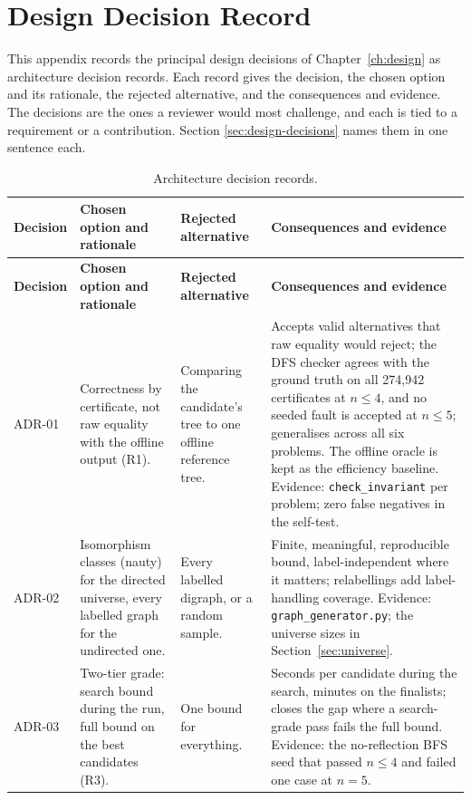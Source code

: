\chapter{Design Decision Record}
\label{app:decisions}

This appendix records the principal design decisions of
Chapter~\ref{ch:design} as architecture decision records. Each record gives the
decision, the chosen option and its rationale, the rejected alternative, and the
consequences and evidence. The decisions are the ones a reviewer would most
challenge, and each is tied to a requirement or a contribution. Section
\ref{sec:design-decisions} names them in one sentence each.

\begingroup\setlength{\tabcolsep}{4pt}
\begin{longtable}{@{}p{}p{}p{}p{}@{}}
\caption{Architecture decision records.}\label{tab:adr}\\
\toprule
\textbf{Decision} & \textbf{Chosen option and rationale} & \textbf{Rejected alternative} & \textbf{Consequences and evidence} \\
\midrule
\endfirsthead
\toprule
\textbf{Decision} & \textbf{Chosen option and rationale} & \textbf{Rejected alternative} & \textbf{Consequences and evidence} \\
\midrule
\endhead
\bottomrule
\endfoot
ADR-01 & Correctness by certificate, not raw equality with the offline output (R1). & Comparing the candidate's tree to one offline reference tree. & Accepts valid alternatives that raw equality would reject; the DFS checker agrees with the ground truth on all 274,942 certificates at $n \le 4$, and no seeded fault is accepted at $n \le 5$; generalises across all six problems. The offline oracle is kept as the efficiency baseline. Evidence: \texttt{check\_invariant} per problem; zero false negatives in the self-test. \\
\addlinespace[2pt]
ADR-02 & Isomorphism classes (nauty) for the directed universe, every labelled graph for the undirected one. & Every labelled digraph, or a random sample. & Finite, meaningful, reproducible bound, label-independent where it matters; relabellings add label-handling coverage. Evidence: \texttt{graph\_generator.py}; the universe sizes in Section~\ref{sec:universe}. \\
\addlinespace[2pt]
ADR-03 & Two-tier grade: search bound during the run, full bound on the best candidates (R3). & One bound for everything. & Seconds per candidate during the search, minutes on the finalists; closes the gap where a search-grade pass fails the full bound. Evidence: the no-reflection BFS seed that passed $n \le 4$ and failed one case at $n = 5$. \\

\end{longtable}
